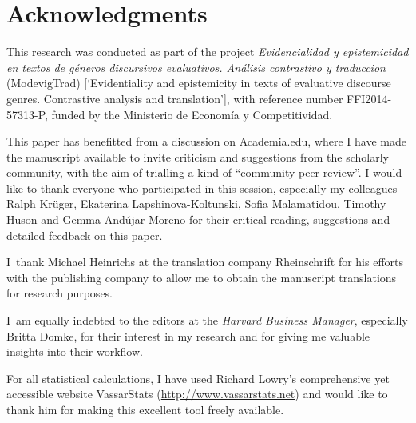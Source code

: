 \documentclass[output=paper]{LSP/langsci}
\begin{document}
\section*{Acknowledgments}

This research was conducted as part of the project \emph{Evidencialidad y epistemicidad en textos de géneros discursivos evaluativos. Análisis contrastivo y traduccion} (ModevigTrad) [`Evidentiality and epistemicity in texts of evaluative discourse genres. Contrastive analysis and translation'], with reference number FFI2014-57313-P, funded by the  Ministerio de Economía y Competitividad.

This paper has benefitted from a discussion on Academia.edu, where I have made the manuscript available to invite criticism and suggestions from the scholarly community, with the aim of trialling a kind of \enquote{community peer review}. I would like to thank everyone who participated in this session, especially my colleagues Ralph Krüger, Ekaterina Lapshinova-Koltunski, Sofia Malamatidou, Timothy Huson and Gemma Andújar Moreno for their critical reading, suggestions and detailed feedback on this paper.

I~thank Michael Heinrichs at the translation company Rheinschrift for his efforts with the publishing company to allow me to obtain the manuscript translations for research purposes.

I~am equally indebted to the editors at the \emph{Harvard Business Manager}, especially Britta Domke, for their interest in my research and for giving me valuable insights into their workflow.

For all statistical calculations, I have used Richard Lowry's comprehensive yet accessible website VassarStats (\url{http://www.vassarstats.net}) and would like to thank him for making this excellent tool freely available.

\sloppy
\printbibliography[heading=subbibliography,notkeyword=this]
\end{document}
